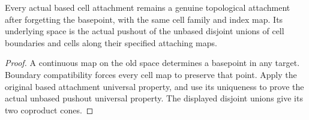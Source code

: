 \begin{proposition}
  \label{prop:actual-based-cell-underlying-attachment}
  \leanok
  Every actual based cell attachment remains a genuine topological attachment after forgetting the basepoint, with the same cell family and index map. Its underlying space is the actual pushout of the unbased disjoint unions of cell boundaries and cells along their specified attaching maps.
\end{proposition}
\begin{proof}
  A continuous map on the old space determines a basepoint in any target. Boundary compatibility forces every cell map to preserve that point. Apply the original based attachment universal property, and use its uniqueness to prove the actual unbased pushout universal property. The displayed disjoint unions give its two coproduct cones.
  \leanok
\end{proof}

